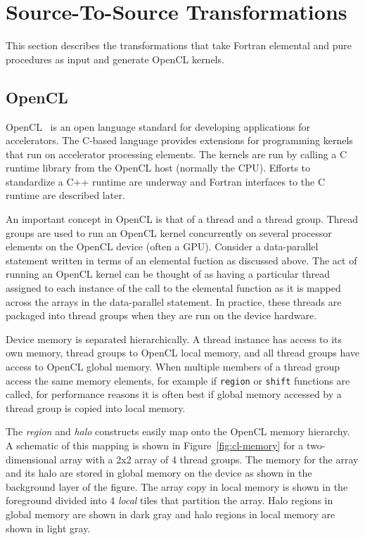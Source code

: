 \section{Source-To-Source Transformations}

This section describes the transformations that take Fortran elemental and
pure procedures as input and generate OpenCL kernels.

\subsection{OpenCL}

OpenCL~\cite{opencl08} is an open language standard for developing
applications for accelerators.  The C-based language provides extensions for
programming kernels that run on accelerator processing elements.  The kernels
are run by calling a C runtime library from the OpenCL host (normally the
CPU).  Efforts to standardize a C++ runtime are underway and Fortran
interfaces to the C runtime are described later.

An important concept in OpenCL is that of a thread and a thread group.  Thread
groups are used to run an OpenCL kernel concurrently on several processor
elements on the OpenCL device (often a GPU).  Consider a data-parallel
statement written in terms of an elemental fuction as discussed above.  The
act of running an OpenCL kernel can be thought of as having a particular
thread assigned to each instance of the call to the elemental function as it
is mapped across the arrays in the data-parallel statement.  In practice,
these threads are packaged into thread groups when they are run on the device
hardware.

Device memory is separated hierarchically.  A thread instance has access to
its own memory, thread groups to OpenCL local memory, and all thread groups
have access to OpenCL global memory.  When multiple members of a thread group
access the same memory elements, for example if {\tt region} or {\tt shift}
functions are called, for performance reasons it is often best if global
memory accessed by a thread group is copied into local memory.

The \emph{region} and \emph{halo} constructs easily map onto the OpenCL memory
hierarchy.  A schematic of this mapping is shown in Figure~\ref{fig:cl-memory}
for a two-dimensional array with a 2x2 array of 4 thread groups.  The memory
for the array and its halo are stored in global memory on the device as shown
in the background layer of the figure.  The array copy in local memory is
shown in the foreground divided into 4 \emph{local} tiles that partition the
array.  Halo regions in global memory are shown in dark gray and halo regions
in local memory are shown in light gray.

